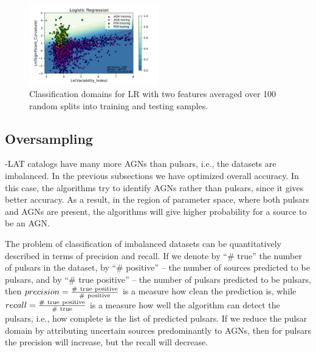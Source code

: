 \begin{figure}[h]

\includegraphics[width=0.5\textwidth]{plots/classification_domains/lr_200_lbfgs.pdf}
\caption{Classification domains for LR with two features 
averaged over 100 random splits into training and testing samples.}
\label{fig:LR_domains}
\end{figure}


\subsection{Oversampling}

\Fermi-LAT catalogs have many more AGNs than pulsars, i.e., the datasets are imbalanced.
In the previous subsections we have optimized overall accuracy. In this case, the algorithms try to identify AGNs rather than pulsars,
since it gives better accuracy. As a result, in the region of parameter space, where both pulsars and AGNs are present, the algorithms
will give higher probability for a source to be an AGN.


The problem of classification of imbalanced datasets can be quantitatively described in terms of precision and recall.
If we denote by ``\# true'' the number of pulsars in the dataset, by ``\# positive'' -- the number of sources predicted to be pulsars, and by 
``\# true positive'' -- the number of pulsars predicted to be pulsars, then  $precision \rm = \frac{\#\ true\ positive}{\#\ positive}$ is a measure how clean the prediction is, while $recall \rm = \frac{\#\ true\ positive}{\#\ true}$ is a measure how well the algorithm can detect the pulsars, i.e., how complete is the list of predicted pulsars.
If we reduce the pulsar domain by attributing uncertain sources predominantly to AGNs, then for pulsars the precision will increase, but the recall will decrease.



